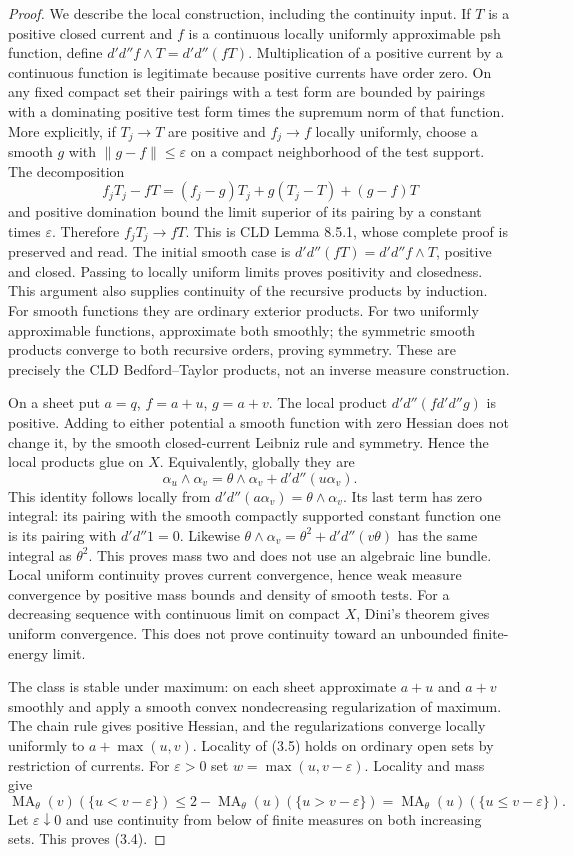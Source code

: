 \documentclass[11pt]{article}
\theoremstyle{definition}\newtheorem{definition}[theorem]{Definition}
\newcommand{\dd}{d'd''}
\newcommand{\MA}{\operatorname{MA}}
\begin{document}
\begin{proof}
We describe the local construction, including the continuity input. If $T$
is a positive closed current and $f$ is a continuous locally uniformly
approximable psh function, define $\dd f\wedge T=\dd(fT)$.
Multiplication of a positive current by a continuous function is legitimate
because positive currents have order zero. On any fixed compact set their
pairings with a test form are bounded by pairings with a dominating positive
test form times the supremum norm of that function.
More explicitly, if $T_j\to T$ are positive and $f_j\to f$ locally uniformly,
choose a smooth $g$ with $\|g-f\|\le\varepsilon$ on a compact neighborhood
of the test support. The decomposition
\[
 f_jT_j-fT=(f_j-g)T_j+g(T_j-T)+(g-f)T
\]
and positive domination bound the limit superior of its pairing by a constant
times $\varepsilon$. Therefore $f_jT_j\to fT$. This is CLD Lemma 8.5.1,
whose complete proof is preserved and read. The initial smooth case is
$\dd(fT)=\dd f\wedge T$, positive and closed. Passing to locally uniform
limits proves positivity and closedness. This argument also supplies
continuity of the recursive products by induction. For smooth functions
they are ordinary exterior products. For two uniformly approximable
functions, approximate both smoothly; the symmetric smooth products converge
to both recursive orders, proving symmetry. These are precisely the CLD
Bedford--Taylor products, not an inverse measure construction.

On a sheet put $a=q$, $f=a+u$, $g=a+v$. The local product
$\dd(f\dd g)$ is positive. Adding to either potential a smooth function
with zero Hessian does not change it, by the smooth closed-current Leibniz
rule and symmetry. Hence the local products glue on $X$. Equivalently,
globally they are
\[
 \alpha_u\wedge\alpha_v
       =\theta\wedge\alpha_v+\dd(u\alpha_v).             \tag{3.5}
\]
This identity follows locally from $\dd(a\alpha_v)=\theta\wedge\alpha_v$.
Its last term has zero integral: its pairing with the smooth compactly
supported constant function one is its pairing with $\dd1=0$.
Likewise $\theta\wedge\alpha_v=\theta^2+\dd(v\theta)$ has the same
integral as $\theta^2$. This proves mass two and does not use an algebraic
line bundle. Local uniform continuity proves current convergence, hence weak
measure convergence by positive mass bounds and density of smooth tests.
For a decreasing sequence with continuous limit on compact $X$, Dini's
theorem gives uniform convergence. This does not prove continuity toward an
unbounded finite-energy limit.

The class is stable under maximum: on each sheet approximate $a+u$ and
$a+v$ smoothly and apply a smooth convex nondecreasing regularization of
maximum. The chain rule gives positive Hessian, and the regularizations
converge locally uniformly to $a+\max(u,v)$. Locality of (3.5) holds on
ordinary open sets by restriction of currents.
For $\varepsilon>0$ set $w=\max(u,v-\varepsilon)$. Locality and mass give
\[
 \MA_\theta(v)(\{u<v-\varepsilon\})
 \le2-\MA_\theta(u)(\{u>v-\varepsilon\})
 =\MA_\theta(u)(\{u\le v-\varepsilon\}).
\]
Let $\varepsilon\downarrow0$ and use continuity from below of finite
measures on both increasing sets. This proves (3.4).
\end{proof}
\end{document}
